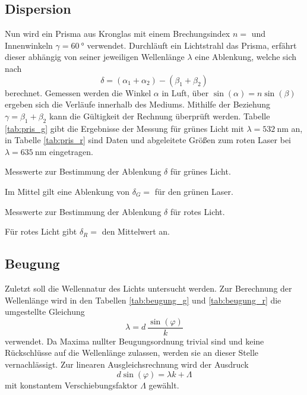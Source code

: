 \subsection{Dispersion}

Nun wird ein Prisma aus Kronglas mit einem Brechungsindex $n = $ und Innenwinkeln $\gamma = \qty{60}{\degree}$ \cite{reflex}
verwendet. Durchläuft ein Lichtstrahl das Prisma, erfährt dieser abhängig von seiner jeweiligen Wellenlänge $\lambda$ eine Ablenkung, welche sich nach
\begin{equation*}
	\delta = (\alpha_1 + \alpha_2) - (\beta_1 + \beta_2)
\end{equation*}
berechnet. Gemessen werden die Winkel $\alpha$ in Luft, über $\sin(\alpha) = n \sin(\beta)$ ergeben sich die Verläufe innerhalb des Mediums.
Mithilfe der Beziehung $\gamma = \beta_1 + \beta_2$ kann die Gültigkeit der Rechnung überprüft werden. Tabelle \ref{tab:pris_g} gibt die
Ergebnisse der Messung für grünes Licht mit $\lambda = \qty{532}{\nano\meter}$ an, in Tabelle \ref{tab:pris_r} sind Daten und abgeleitete Größen
zum roten Laser bei $\lambda = \qty{635}{\nano\meter}$ eingetragen.

\begin{table}[H]
	\centering
	\caption{Messwerte zur Bestimmung der Ablenkung $\delta$ für grünes Licht.}
	
	\label{tab:pris_g}
\end{table}

Im Mittel gilt eine Ablenkung von $\delta_G = $ für den grünen Laser.

\begin{table}[H]
	\centering
	\caption{Messwerte zur Bestimmung der Ablenkung $\delta$ für rotes Licht.}
	
	\label{tab:pris_r}
\end{table}

Für rotes Licht gibt $\delta_R = $ den Mittelwert an.

\newpage
\subsection{Beugung}

Zuletzt soll die Wellennatur des Lichts untersucht werden. Zur Berechnung der Wellenlänge wird in den Tabellen \ref{tab:beugung_g} und
\ref{tab:beugung_r} die umgestellte Gleichung
\begin{equation*}
	\lambda = d \: \frac{\sin(\varphi)}{k}
\end{equation*}
verwendet. Da Maxima nullter Beugungsordnung trivial sind und keine Rückschlüsse auf die Wellenlänge zulassen, werden sie an dieser Stelle
vernachlässigt. Zur linearen Ausgleichsrechnung wird der Ausdruck
\begin{equation*}
	d \sin(\varphi) = \lambda k + \Lambda
\end{equation*}
mit konstantem Verschiebungsfaktor $\Lambda$ gewählt.

